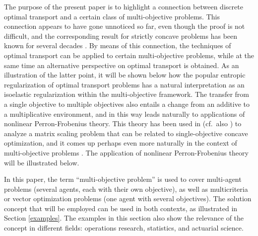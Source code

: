 \documentclass{article}
\theoremstyle{definition}
\begin{document}
The purpose of the present paper is to highlight a connection between discrete optimal transport and a certain class of multi-objective problems. This connection appears to have gone unnoticed so far, even though the proof is not difficult, and the corresponding result for strictly concave problems has been known for several decades \cite{Gale77,Gale79,Buehlmann79}. By means of this connection, the techniques of optimal transport can be applied to certain multi-objective problems, while at the same time an alternative perspective on optimal transport is obtained. As an illustration of the latter point, it will be shown below how the popular entropic regularization of optimal transport problems \cite{Cuturi,Benamou} has a natural interpretation as an isoelastic regularization within the multi-objective framework. The transfer from a single objective to multiple objectives also entails a change from an additive to a multiplicative environment, and in this way leads naturally to applications of nonlinear Perron-Frobenius theory. This theory has been used in \cite{Brualdi} (cf.\ also \cite{Lemmens}) to analyze a matrix scaling problem that can be related to single-objective concave optimization, and it comes up perhaps even more naturally in the context of multi-objective problems \cite{PSW1}. The application of nonlinear Perron-Frobenius theory will be illustrated below.

In this paper, the term ``multi-objective problem'' is used to cover multi-agent problems (several agents, each with their own objective), as well as multicriteria or vector optimization problems (one agent with several objectives). The solution concept that will be employed can be used in both contexts, as illustrated in Section \ref{examples}. The examples in this section also show the relevance of the concept in different fields: operations research, statistics, and actuarial science.
\end{document}
